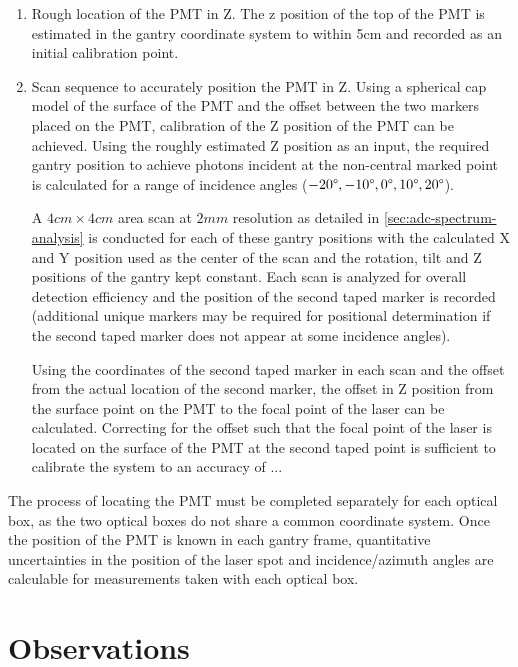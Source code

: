 \documentclass[journal]{IEEEtran}
\begin{document}
\begin{enumerate}
	\item Rough location of the PMT in Z.  The z position of the top of the PMT is estimated in the gantry coordinate system to within 5cm and recorded as an initial calibration point.
	\item Scan sequence to accurately position the PMT in Z.  Using a spherical cap model of the surface of the PMT and the offset between the two markers placed on the PMT, calibration of the Z position of the PMT can be achieved. Using the roughly estimated Z position as an input, the required gantry position to achieve photons incident at the non-central marked point is calculated for a range of incidence angles ($-20\degree, -10\degree, 0\degree, 10\degree, 20\degree$). 
	
	A $4cm\times4cm$ area scan at $2mm$ resolution as detailed in \ref{sec:adc-spectrum-analysis} is conducted for each of these gantry positions with the calculated X and Y position used as the center of the scan and the rotation, tilt and Z positions of the gantry kept constant. Each scan is analyzed for overall detection efficiency and the position of the second taped marker is recorded (additional unique markers may be required for positional determination if the second taped marker does not appear at some incidence angles).
	
	Using the coordinates of the second taped marker in each scan and the offset from the actual location of the second marker, the offset in Z position from the surface point on the PMT to the focal point of the laser can be calculated.  Correcting for the offset such that the focal point of the laser is located on the surface of the PMT at the second taped point is sufficient to calibrate the system to an accuracy of ... 
	
\end{enumerate}
The process of locating the PMT must be completed separately for each optical box, as the two optical boxes do not share a common coordinate system.  Once the position of the PMT is known in each gantry frame, quantitative uncertainties in the position of the laser spot and incidence/azimuth angles are calculable for measurements taken with each optical box. 

\section{Observations}
\end{document}
